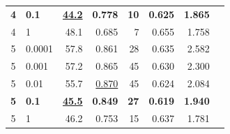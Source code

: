 \documentclass[12pt]{jarticle}
\numberwithin{equation}{section}    %
\numberwithin{figure}{section}      %
\numberwithin{table}{section}      %
\begin{document}
\begin{table}[bt]
\begin{center}
{\begin{tabular}{|c|l|rrrrrr|}
                \textbf{4}               & \textbf{0.1}                             & \underline{\textbf{44.2}}    & \textbf{0.778}            & \textbf{10}                & \textbf{0.625}                & \textbf{1.865}                    &                                    \\
                4                        & 1                                        & 48.1                         & 0.685                     & 7                          & 0.655                         & 1.758                             &                                    \\
                \hline
                5                        & 0.0001                                   & 57.8                         & 0.861                     & 28                         & 0.635                         & 2.582                             &                                    \\
                5                        & 0.001                                    & 57.2                         & 0.865                     & 45                         & 0.630                         & 2.300                             &                                    \\
                5                        & 0.01                                     & 55.7                         & \underline{0.870}         & 45                         & 0.624                         & 2.084                             &                                    \\
                \textbf{5}               & \textbf{0.1}                             & \underline{\textbf{45.5}}    & \textbf{0.849}            & \textbf{27}                & \textbf{0.619}                & \textbf{1.940}                    &                                    \\
                5                        & 1                                        & 46.2                         & 0.753                     & 15                         & 0.637                         & 1.781                             &                                    \\
                \hline
            \end{tabular}
        }
    \end{center}
\end{table}
\end{document}
